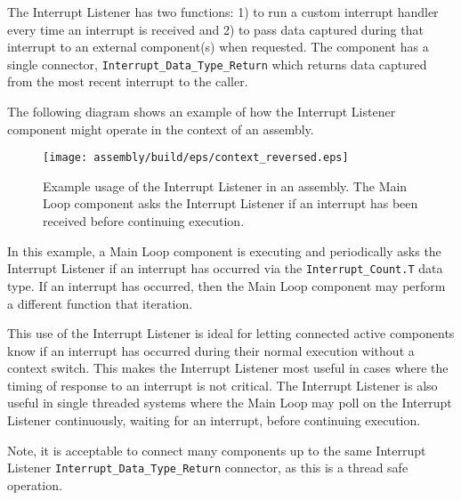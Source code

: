 The Interrupt Listener has two functions: 1) to run a custom interrupt handler every time an interrupt is received and 2) to pass data captured during that interrupt to an external component(s) when requested. The component has a single connector, \texttt{Interrupt\_Data\_Type\_Return} which returns data captured from the most recent interrupt to the caller.

The following diagram shows an example of how the Interrupt Listener component might operate in the context of an assembly.

\begin{figure}[H]
  \texttt{[image: assembly/build/eps/context\_reversed.eps]}
  \caption{Example usage of the Interrupt Listener in an assembly. The Main Loop component asks the Interrupt Listener if an interrupt has been received before continuing execution.}
\end{figure}

In this example, a Main Loop component is executing and periodically asks the Interrupt Listener if an interrupt has occurred via the \texttt{Interrupt\_Count.T} data type. If an interrupt has occurred, then the Main Loop component may perform a different function that iteration.

This use of the Interrupt Listener is ideal for letting connected active components know if an interrupt has occurred during their normal execution without a context switch. This makes the Interrupt Listener most useful in cases where the timing of response to an interrupt is not critical. The Interrupt Listener is also useful in single threaded systems where the Main Loop may poll on the Interrupt Listener continuously, waiting for an interrupt, before continuing execution. 

Note, it is acceptable to connect many components up to the same Interrupt Listener \texttt{Interrupt\_Data\_Type\_Return} connector, as this is a thread safe operation.
